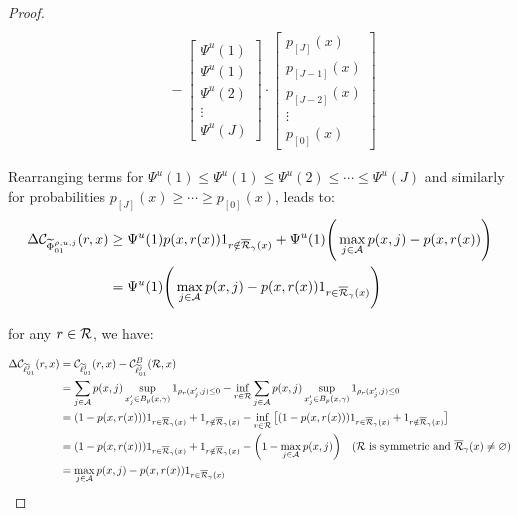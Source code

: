 \begin{appendices}
\begin{proof}
\begin{equation}
\begin{aligned}
 \\
 & \quad -
\begin{bmatrix}
    \Psi^u(1) \\
    \Psi^u(1) \\
    \Psi^u(2) \\
    \vdots \\
    \Psi^u(J)
\end{bmatrix}
\cdot
\begin{bmatrix}
    p_{[J]}(x) \\
    p_{[J-1]}(x) \\
    p_{[J-2]}(x) \\
    \vdots \\
    p_{[0]}(x)
\end{bmatrix}
\end{aligned}
\end{equation}

Rearranging terms for $\Psi^u(1)\leq \Psi^u(1) \leq \Psi^u(2)\leq \cdots \leq \Psi^u(J)$ and similarly for probabilities $p_{[J]}(x)\geq \cdots\geq p_{[0]}(x)$, leads to:
\begin{equation}
    \begin{aligned}
   \Delta \mathcal{C}_{\widetilde{\Phi}_{01}^{\rho,u,j}}(r,x) &\geq \Psi^u(1) p(x, r(x)) 1_{r \notin \overline{\mathcal{R}}_\gamma(x)} + \Psi^u(1) \Bigg(\max_{j \in \mathcal{A}} p(x, j) - p(x, r(x)) \Bigg) \\
    &= \Psi^u(1) \Bigg(\max_{j \in \mathcal{A}} p(x, j) - p(x, r(x)) 1_{r \in \overline{\mathcal{R}}_\gamma(x)}\Bigg)
    \end{aligned}
\end{equation}


for any $r\in\mathcal{R}$, we have:

\begin{align}
    \Delta \mathcal{C}_{\widetilde{\ell}_{01}^j}(r, x) &= \mathcal{C}_{\widetilde{\ell}_{01}^j}(r, x) - \mathcal{C}_{\widetilde{\ell}_{01}^j}^B(\mathcal{R}, x) \notag \\
    &= \sum_{j \in \mathcal{A}} p(x, j) \sup_{x_j' \in B_p(x,\gamma)} 1_{\rho_r(x'_j, j) \leq 0} - \inf_{r \in \mathcal{R}} \sum_{j \in \mathcal{A}} p(x, j) \sup_{x_j' \in B_p(x,\gamma)} 1_{\rho_r(x'_j, j) \leq 0} \notag \\
    &= (1 - p(x, r(x))) 1_{r \in \overline{\mathcal{R}}_\gamma(x)} + 1_{r \notin \overline{\mathcal{R}}_\gamma(x)} - \inf_{r \in \mathcal{R}} \big[(1 - p(x, r(x))) 1_{r \in \overline{\mathcal{R}}_\gamma(x)} + 1_{r \notin \overline{\mathcal{R}}_\gamma(x)}\big] \notag \\
    &= (1 - p(x, r(x))) 1_{r \in \overline{\mathcal{R}}_\gamma(x)} + 1_{r \notin \overline{\mathcal{R}}_\gamma(x)} - \bigg(1 - \max_{j \in \mathcal{A}} p(x, j)\bigg) \quad (\mathcal{R} \text{ is symmetric and } \overline{\mathcal{R}}_\gamma(x) \neq \varnothing) \notag \\
    &= \max_{j \in \mathcal{A}} p(x, j) - p(x, r(x)) 1_{r \in \overline{\mathcal{R}}_\gamma(x)}
\end{align}


\end{proof}
\end{appendices}
